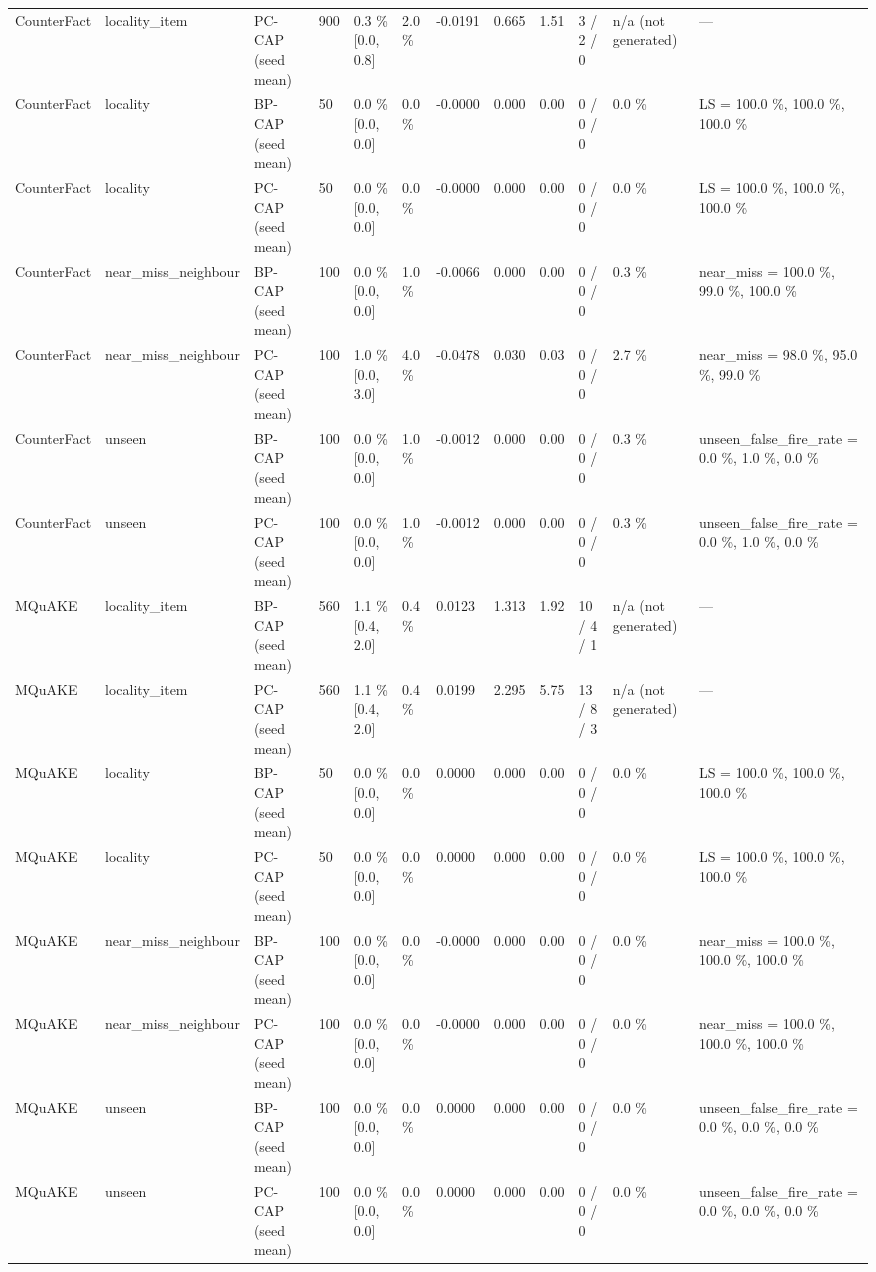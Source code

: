 \documentclass[10pt,a4paper]{article}
\begin{document}
\begin{center}
\begin{tabularx}{\textwidth}{@{}p{}XXXXXXXXXXX@{}}
CounterFact & locality\_item & PC-CAP (seed mean) & 900 & 0.3 \% [0.0, 0.8] & 2.0 \% & -0.0191 & 0.665 & 1.51 & 3 / 2 / 0 & n/a (not generated) & — \\
CounterFact & locality & BP-CAP (seed mean) & 50 & 0.0 \% [0.0, 0.0] & 0.0 \% & -0.0000 & 0.000 & 0.00 & 0 / 0 / 0 & 0.0 \% & LS = 100.0 \%, 100.0 \%, 100.0 \% \\
CounterFact & locality & PC-CAP (seed mean) & 50 & 0.0 \% [0.0, 0.0] & 0.0 \% & -0.0000 & 0.000 & 0.00 & 0 / 0 / 0 & 0.0 \% & LS = 100.0 \%, 100.0 \%, 100.0 \% \\
CounterFact & near\_miss\_neighbour & BP-CAP (seed mean) & 100 & 0.0 \% [0.0, 0.0] & 1.0 \% & -0.0066 & 0.000 & 0.00 & 0 / 0 / 0 & 0.3 \% & near\_miss = 100.0 \%, 99.0 \%, 100.0 \% \\
CounterFact & near\_miss\_neighbour & PC-CAP (seed mean) & 100 & 1.0 \% [0.0, 3.0] & 4.0 \% & -0.0478 & 0.030 & 0.03 & 0 / 0 / 0 & 2.7 \% & near\_miss = 98.0 \%, 95.0 \%, 99.0 \% \\
CounterFact & unseen & BP-CAP (seed mean) & 100 & 0.0 \% [0.0, 0.0] & 1.0 \% & -0.0012 & 0.000 & 0.00 & 0 / 0 / 0 & 0.3 \% & unseen\_false\_fire\_rate = 0.0 \%, 1.0 \%, 0.0 \% \\
CounterFact & unseen & PC-CAP (seed mean) & 100 & 0.0 \% [0.0, 0.0] & 1.0 \% & -0.0012 & 0.000 & 0.00 & 0 / 0 / 0 & 0.3 \% & unseen\_false\_fire\_rate = 0.0 \%, 1.0 \%, 0.0 \% \\
MQuAKE & locality\_item & BP-CAP (seed mean) & 560 & 1.1 \% [0.4, 2.0] & 0.4 \% & 0.0123 & 1.313 & 1.92 & 10 / 4 / 1 & n/a (not generated) & — \\
MQuAKE & locality\_item & PC-CAP (seed mean) & 560 & 1.1 \% [0.4, 2.0] & 0.4 \% & 0.0199 & 2.295 & 5.75 & 13 / 8 / 3 & n/a (not generated) & — \\
MQuAKE & locality & BP-CAP (seed mean) & 50 & 0.0 \% [0.0, 0.0] & 0.0 \% & 0.0000 & 0.000 & 0.00 & 0 / 0 / 0 & 0.0 \% & LS = 100.0 \%, 100.0 \%, 100.0 \% \\
MQuAKE & locality & PC-CAP (seed mean) & 50 & 0.0 \% [0.0, 0.0] & 0.0 \% & 0.0000 & 0.000 & 0.00 & 0 / 0 / 0 & 0.0 \% & LS = 100.0 \%, 100.0 \%, 100.0 \% \\
MQuAKE & near\_miss\_neighbour & BP-CAP (seed mean) & 100 & 0.0 \% [0.0, 0.0] & 0.0 \% & -0.0000 & 0.000 & 0.00 & 0 / 0 / 0 & 0.0 \% & near\_miss = 100.0 \%, 100.0 \%, 100.0 \% \\
MQuAKE & near\_miss\_neighbour & PC-CAP (seed mean) & 100 & 0.0 \% [0.0, 0.0] & 0.0 \% & -0.0000 & 0.000 & 0.00 & 0 / 0 / 0 & 0.0 \% & near\_miss = 100.0 \%, 100.0 \%, 100.0 \% \\
MQuAKE & unseen & BP-CAP (seed mean) & 100 & 0.0 \% [0.0, 0.0] & 0.0 \% & 0.0000 & 0.000 & 0.00 & 0 / 0 / 0 & 0.0 \% & unseen\_false\_fire\_rate = 0.0 \%, 0.0 \%, 0.0 \% \\
MQuAKE & unseen & PC-CAP (seed mean) & 100 & 0.0 \% [0.0, 0.0] & 0.0 \% & 0.0000 & 0.000 & 0.00 & 0 / 0 / 0 & 0.0 \% & unseen\_false\_fire\_rate = 0.0 \%, 0.0 \%, 0.0 \% \\
\bottomrule
\end{tabularx}
\end{center}
\end{document}
